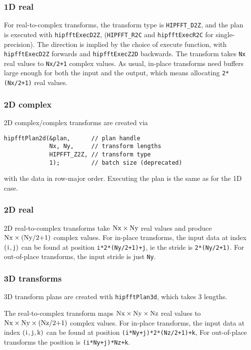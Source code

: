 \documentclass[10pt]{article}
\renewcommand{\(}{\left(}
\renewcommand{\)}{\right)}
\begin{document}
\subsubsection{1D real}

For real-to-complex transforms, the transform type is
\lstinline{HIPFFT_D2Z}, and the plan is executed with
\lstinline{hipfftExecD2Z}, (\lstinline{HIPFFT_R2C} and
\lstinline{hipfftExecR2C} for single-precision).  The direction is
implied by the choice of execute function, with
\lstinline{hipfftExecD2Z} forwards and \lstinline{hipfftExecZ2D}
backwards.  The transform takes \lstinline{Nx} real values to
\lstinline{Nx/2+1} complex values.  As usual, in-place transforms need
buffers large enough for both the input and the output, which means
allocating \lstinline{2*(Nx/2+1)} real values.

\subsubsection{2D complex}
2D complex/complex transforms are created via
\begin{lstlisting}
hipfftPlan2d(&plan,      // plan handle
             Nx, Ny,     // transform lengths
             HIPFFT_Z2Z, // transform type 
             1);         // batch size (deprecated)
\end{lstlisting}
with the data in row-major order.  Executing the plan is the same as
for the 1D case.

\subsubsection{2D real}
2D real-to-complex transforms take
$\text{\lstinline{Nx}}\times{}\text{\lstinline{Ny}}$ real values and
produce $\text{\lstinline{Nx}}\times{}(\text{\lstinline{Ny/2+1}})$
complex values.  For in-place transforms, the input data at index
$\(\text{\lstinline{i}},\text{\lstinline{j}}\)$ can be found at
position \lstinline{i*2*(Ny/2+1)+j}, ie the stride is
\lstinline{2*(Ny/2+1)}.  For out-of-place transforms, the input stride
is just \lstinline{Ny}.

\subsubsection{3D transforms}
3D transform plans are created with \lstinline{hipfftPlan3d}, which
takes 3 lengths.

The real-to-complex transform maps
$\text{\lstinline{Nx}}\times{}\text{\lstinline{Ny}}\times{}\text{\lstinline{Nz}}$
real values to
$\text{\lstinline{Nx}}\times{}\text{\lstinline{Ny}}\times{}(\text{\lstinline{Nz/2+1}})$
complex values.  For in-place transforms, the input data at index
$\(\text{\lstinline{i}},\text{\lstinline{j}},\text{\lstinline{k}}\)$
can be found at position \lstinline{(i*Ny+j)*2*(Nz/2+1)+k}, For
out-of-place transforms the position is \lstinline{(i*Ny+j)*Nz+k}.
\end{document}
